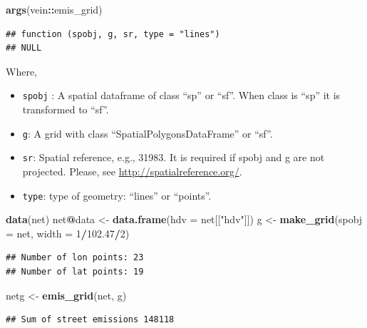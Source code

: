 \documentclass[12pt,graybox,envcountchap,sectrefs]{krantz}
\makeatletter
\newenvironment{Shaded}{\begin{snugshade}}{\end{snugshade}}
\newcommand{\KeywordTok}[1]{\textcolor[rgb]{0.13,0.29,0.53}{\textbf{#1}}}
\newcommand{\DataTypeTok}[1]{\textcolor[rgb]{0.13,0.29,0.53}{#1}}
\newcommand{\DecValTok}[1]{\textcolor[rgb]{0.00,0.00,0.81}{#1}}
\newcommand{\FloatTok}[1]{\textcolor[rgb]{0.00,0.00,0.81}{#1}}
\newcommand{\StringTok}[1]{\textcolor[rgb]{0.31,0.60,0.02}{#1}}
\newcommand{\OperatorTok}[1]{\textcolor[rgb]{0.81,0.36,0.00}{\textbf{#1}}}
\newcommand{\NormalTok}[1]{#1}
\providecommand{\tightlist}{%
  \setlength{\itemsep}{0pt}\setlength{\parskip}{0pt}}
\newenvironment{kframe}{%
\medskip{}
\setlength{\fboxsep}{.8em}
 \def\at@end@of@kframe{}%
 \ifinner\ifhmode%
  \def\at@end@of@kframe{\end{minipage}}%
  \begin{minipage}{\columnwidth}%
 \fi\fi%
 \def\FrameCommand##1{\hskip\@totalleftmargin \hskip-\fboxsep
 \colorbox{shadecolor}{##1}\hskip-\fboxsep
     \hskip-\linewidth \hskip-\@totalleftmargin \hskip\columnwidth}%
 \MakeFramed {\advance\hsize-\width
   \@totalleftmargin\z@ \linewidth\hsize
   \@setminipage}}%
 {\par\unskip\endMakeFramed%
 \at@end@of@kframe}
\renewenvironment{Shaded}{\begin{kframe}}{\end{kframe}}
\theoremstyle{definition}
\theoremstyle{definition}
\theoremstyle{definition}
\theoremstyle{remark}
\makeatother
\begin{document}
\begin{Shaded}
\begin{Highlighting}[]
\KeywordTok{args}\NormalTok{(vein}\OperatorTok{::}\NormalTok{emis_grid)}
\end{Highlighting}
\end{Shaded}

\begin{verbatim}
## function (spobj, g, sr, type = "lines") 
## NULL
\end{verbatim}

Where,

\begin{itemize}
\tightlist
\item
  \texttt{spobj} : A spatial dataframe of class ``sp'' or ``sf''. When
  class is ``sp'' it is transformed to ``sf''.
\item
  \texttt{g}: A grid with class ``SpatialPolygonsDataFrame'' or ``sf''.
\item
  \texttt{sr}: Spatial reference, e.g., 31983. It is required if spobj
  and g are not projected. Please, see
  \url{http://spatialreference.org/}.
\item
  \texttt{type}: type of geometry: ``lines'' or ``points''.
\end{itemize}

\begin{Shaded}
\begin{Highlighting}[]
\KeywordTok{data}\NormalTok{(net)}
\NormalTok{net}\OperatorTok{@}\NormalTok{data <-}\StringTok{ }\KeywordTok{data.frame}\NormalTok{(}\DataTypeTok{hdv =}\NormalTok{ net[[}\StringTok{"hdv"}\NormalTok{]])}
\NormalTok{g <-}\StringTok{ }\KeywordTok{make_grid}\NormalTok{(}\DataTypeTok{spobj =}\NormalTok{ net, }\DataTypeTok{width =} \DecValTok{1}\OperatorTok{/}\FloatTok{102.47}\OperatorTok{/}\DecValTok{2}\NormalTok{)}
\end{Highlighting}
\end{Shaded}

\begin{verbatim}
## Number of lon points: 23
## Number of lat points: 19
\end{verbatim}

\begin{Shaded}
\begin{Highlighting}[]
\NormalTok{netg <-}\StringTok{ }\KeywordTok{emis_grid}\NormalTok{(net, g)}
\end{Highlighting}
\end{Shaded}

\begin{verbatim}
## Sum of street emissions 148118
\end{verbatim}
\end{document}
